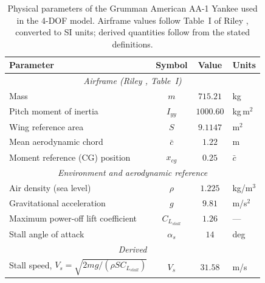 \documentclass[journal ]{new-aiaa}
\begin{document}
\begin{table}[H]
\centering
\caption{Physical parameters of the Grumman American AA-1 Yankee used
in the 4-DOF model. Airframe values follow Table~I of Riley
\cite{Riley1985}, converted to SI units; derived quantities follow
from the stated definitions.}
\label{tab:aa1_params}
\begin{tabular}{l c c l}
\toprule
\textbf{Parameter} & \textbf{Symbol} & \textbf{Value} & \textbf{Units} \\
\midrule
\multicolumn{4}{c}{\textit{Airframe (Riley \cite{Riley1985}, Table~I)}} \\
\midrule
Mass & $m$ & $715.21$ & kg \\
Pitch moment of inertia & $I_{yy}$ & $1000.60$ & kg\,m$^2$ \\
Wing reference area & $S$ & $9.1147$ & m$^2$ \\
Mean aerodynamic chord & $\bar{c}$ & $1.22$ & m \\
Moment reference (CG) position & $x_{cg}$ & $0.25$ & $\bar{c}$ \\
\midrule
\multicolumn{4}{c}{\textit{Environment and aerodynamic reference}} \\
\midrule
Air density (sea level) & $\rho$ & $1.225$ & kg/m$^3$ \\
Gravitational acceleration & $g$ & $9.81$ & m/s$^2$ \\
Maximum power-off lift coefficient & $C_{L_{stall}}$ & $1.26$ & --- \\
Stall angle of attack & $\alpha_s$ & $14$ & deg \\
\midrule
\multicolumn{4}{c}{\textit{Derived}} \\
\midrule
Stall speed, $V_s = \sqrt{2mg/(\rho S C_{L_{stall}})}$ & $V_s$ & $31.58$ & m/s \\
\bottomrule
\end{tabular}
\end{table}
\end{document}
